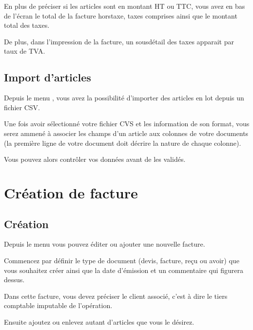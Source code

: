 \documentclass[a4paper,10pt,oneside,french]{sphinxmanual}
\begin{document}
En plus de préciser si les articles sont en montant HT ou TTC, vous avez en bas de l’écran le total de la facture hors\sphinxhyphen{}taxe, taxes comprises ainsi que le montant total des taxes.

De plus, dans l’impression de la facture, un sous\sphinxhyphen{}détail des taxes apparait par taux de TVA.


\subsection{Import d’articles}
\label{\detokenize{invoice/articles:import-d-articles}}
Depuis le menu , vous avez la possibilité d’importer des articles en lot depuis un fichier CSV.

Une fois avoir sélectionné votre fichier CVS et les information de son format,
vous serez ammené à associer les champs d’un article aux colonnes de votre documents (la première ligne de votre document doit décrire la nature de chaque colonne).

Vous pouvez alors contrôler vos données avant de les validés.


\section{Création de facture}
\label{\detokenize{invoice/create_bill:creation-de-facture}}\label{\detokenize{invoice/create_bill::doc}}

\subsection{Création}
\label{\detokenize{invoice/create_bill:creation}}
Depuis le menu  vous pouvez éditer ou ajouter une nouvelle facture.

Commencez par définir le type de document (devis, facture, reçu ou avoir) que vous souhaitez créer ainsi que la date d’émission et un commentaire qui figurera dessus.

Dans cette facture, vous devez préciser le client associé, c’est à dire le tiers comptable imputable de l’opération.
\begin{quote}

\noindent{}
\end{quote}

Ensuite ajoutez ou enlevez autant d’articles que vous le désirez.
\begin{quote}

\noindent{}
\end{quote}
\end{document}
